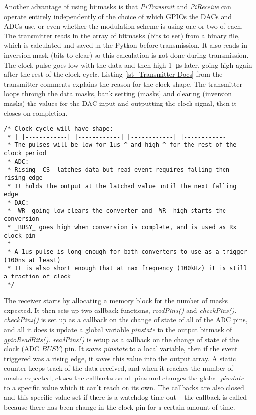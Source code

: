 \documentclass[../main.tex]{subfiles}
\begin{document}
Another advantage of using bitmasks is that \textit{PiTransmit} and \textit{PiReceive} can operate entirely independently of the choice of which GPIOs the DACs and ADCs use, or even whether the modulation scheme is using one or two of each.
The transmitter reads in the array of bitmasks (bits to set) from a binary file, which is calculated and saved in the Python before transmission.
It also reads in inversion mask (bits to clear) so this calculation is not done during transmission.
The clock pulse goes low with the data and then high \SI{1}{\micro\second} later, going high again after the rest of the clock cycle.
Listing \ref{lst_Transmitter Docs} from the transmitter comments explains the reason for the clock shape.
The transmitter loops through the data masks, bank setting (masks) and clearing (inversion masks) the values for the DAC input and outputting the clock signal, then it closes on completion.\\

\newpage

\lstset{style=C}
\begin{lstlisting}[caption={Transmitter documentation explaining the clock signal}, label={lst_Transmitter Docs}]
/* Clock cycle will have shape:
 * |_|------------|_|------------|_|------------|_|------------
 * The pulses will be low for 1us ^ and high ^ for the rest of the clock period
 * ADC:
 * Rising _CS_ latches data but read event requires falling then rising edge
 * It holds the output at the latched value until the next falling edge
 * DAC:
 * _WR_ going low clears the converter and _WR_ high starts the conversion
 * _BUSY_ goes high when conversion is complete, and is used as Rx clock pin
 *
 * A 1us pulse is long enough for both converters to use as a trigger (100ns at least)
 * It is also short enough that at max frequency (100kHz) it is still a fraction of clock
 */
\end{lstlisting}

The receiver starts by allocating a memory block for the number of masks expected.
It then sets up two callback functions, \textit{readPins()} and \textit{checkPins()}.
\textit{checkPins()} is set up as a callback on the change of state of all of the ADC pins, and all it does is update a global variable \textit{pin\textunderscore state} to the output bitmask of \textit{gpioRead\textunderscore Bits()}.
\textit{readPins()} is setup as a callback on the change of state of the clock (ADC $\overline{BUSY}$) pin.
It saves \textit{pin\textunderscore state} to a local variable, then if the event triggered was a rising edge, it saves this value into the output array.
A static counter keeps track of the data received, and when it reaches the number of masks expected, closes the callbacks on all pins and changes the global \textit{pin\textunderscore state} to a specific value which it can't reach on its own.
The callbacks are also closed and this specific value set if there is a watchdog time-out -- the callback is called because there has been change in the clock pin for a certain amount of time.\\
\end{document}
